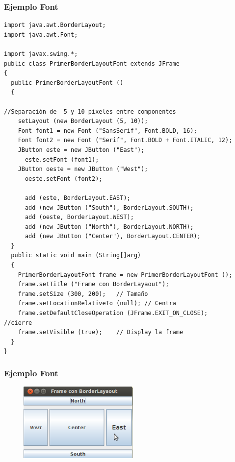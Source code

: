 \documentclass{beamer}
\begin{document}
\begin{frame}[fragile]
\frametitle{Ejemplo Font}
\begin{tiny}
\begin{verbatim}
import java.awt.BorderLayout;
import java.awt.Font;

import javax.swing.*;
public class PrimerBorderLayoutFont extends JFrame
{
  public PrimerBorderLayoutFont ()
  {

//Separación de  5 y 10 pixeles entre componentes
    setLayout (new BorderLayout (5, 10));
    Font font1 = new Font ("SansSerif", Font.BOLD, 16);
    Font font2 = new Font ("Serif", Font.BOLD + Font.ITALIC, 12);
    JButton este = new JButton ("East");
      este.setFont (font1);
    JButton oeste = new JButton ("West");
      oeste.setFont (font2);

      add (este, BorderLayout.EAST);
      add (new JButton ("South"), BorderLayout.SOUTH);
      add (oeste, BorderLayout.WEST);
      add (new JButton ("North"), BorderLayout.NORTH);
      add (new JButton ("Center"), BorderLayout.CENTER);
  }
  public static void main (String[]arg)
  {
    PrimerBorderLayoutFont frame = new PrimerBorderLayoutFont ();
    frame.setTitle ("Frame con BorderLayaout");
    frame.setSize (300, 200);   // Tamaño
    frame.setLocationRelativeTo (null); // Centra
    frame.setDefaultCloseOperation (JFrame.EXIT_ON_CLOSE);      //cierre
    frame.setVisible (true);    // Display la frame
  }
}
\end{verbatim}
\end{tiny}
\end{frame}

\begin{frame}
\frametitle{Ejemplo Font} 
\begin{figure}
\includegraphics[scale=0.9]{imagenes/font.png} 
\end{figure} 
\end{frame}
\end{document}
